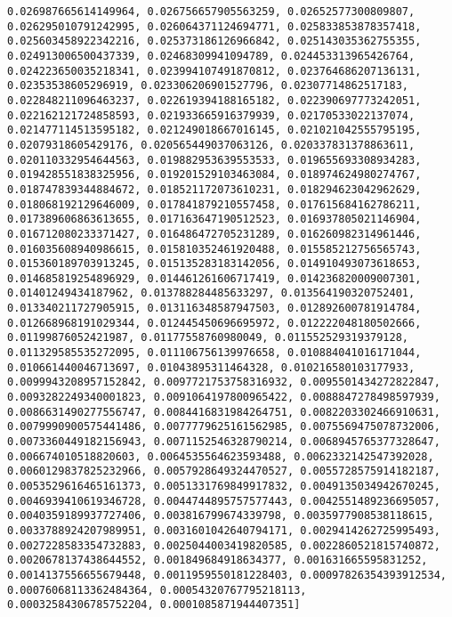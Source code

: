 \documentclass[11pt]{article}
\begin{document}
\begin{Verbatim}[commandchars=\\\{\}]
0.026987665614149964, 0.026756657905563259, 0.02652577300809807, 0.026295010791242995, 0.026064371124694771, 0.025833853878357418, 0.025603458922342216, 0.025373186126966842, 0.025143035362755355, 0.024913006500437339, 0.02468309941094789, 0.024453313965426764, 0.024223650035218341, 0.023994107491870812, 0.023764686207136131, 0.02353538605296919, 0.023306206901527796, 0.02307714862517183, 0.022848211096463237, 0.022619394188165182, 0.022390697773242051, 0.022162121724858593, 0.021933665916379939, 0.02170533022137074, 0.021477114513595182, 0.021249018667016145, 0.021021042555795195, 0.02079318605429176, 0.020565449037063126, 0.020337831378863611, 0.020110332954644563, 0.019882953639553533, 0.019655693308934283, 0.019428551838325956, 0.019201529103463084, 0.018974624980274767, 0.018747839344884672, 0.018521172073610231, 0.018294623042962629, 0.018068192129646009, 0.017841879210557458, 0.017615684162786211, 0.017389606863613655, 0.017163647190512523, 0.016937805021146904, 0.016712080233371427, 0.016486472705231289, 0.016260982314961446, 0.016035608940986615, 0.015810352461920488, 0.015585212756565743, 0.015360189703913245, 0.015135283183142056, 0.014910493073618653, 0.014685819254896929, 0.014461261606717419, 0.014236820009007301, 0.01401249434187962, 0.013788284485633297, 0.013564190320752401, 0.013340211727905915, 0.013116348587947503, 0.012892600781914784, 0.012668968191029344, 0.012445450696695972, 0.012222048180502666, 0.01199876052421987, 0.01177558760980049, 0.011552529319379128, 0.011329585535272095, 0.011106756139976658, 0.010884041016171044, 0.010661440046713697, 0.01043895311464328, 0.010216580103177933, 0.0099943208957152842, 0.0097721753758316932, 0.0095501434272822847, 0.0093282249340001823, 0.0091064197800965422, 0.0088847278498597939, 0.0086631490277556747, 0.0084416831984264751, 0.0082203302466910631, 0.0079990900575441486, 0.0077779625161562985, 0.0075569475078732006, 0.0073360449182156943, 0.0071152546328790214, 0.0068945765377328647, 0.006674010518820603, 0.0064535564623593488, 0.0062332142547392028, 0.0060129837825232966, 0.0057928649324470527, 0.0055728575914182187, 0.0053529616465161373, 0.0051331769849917832, 0.0049135034942670245, 0.0046939410619346728, 0.0044744895757577443, 0.0042551489236695057, 0.0040359189937727406, 0.003816799674339798, 0.0035977908538118615, 0.0033788924207989951, 0.0031601042640794171, 0.0029414262725995493, 0.0027228583354732883, 0.0025044003419820585, 0.0022860521815740872, 0.0020678137438644552, 0.001849684918634377, 0.001631665595831252, 0.0014137556655679448, 0.0011959550181228403, 0.00097826354393912534, 0.00076068113362484364, 0.00054320767795218113, 0.00032584306785752204, 0.0001085871944407351]

\end{Verbatim}
\end{document}
